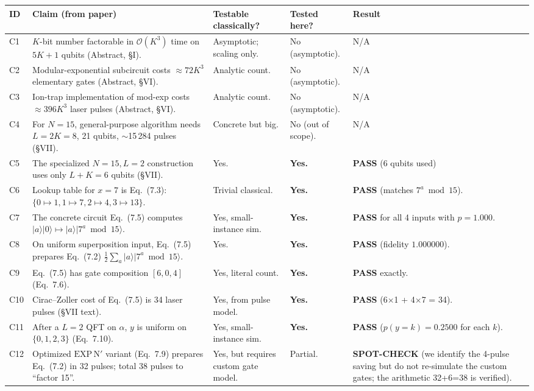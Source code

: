 \documentclass[11pt]{article}
\begin{document}
\begin{longtable}{@{}p{}p{}p{}p{}p{}@{}}
\toprule
\textbf{ID} & \textbf{Claim (from paper)} & \textbf{Testable classically?} & \textbf{Tested here?} & \textbf{Result} \\
\midrule
\endhead
C1 & $K$-bit number factorable in $\mathcal{O}(K^3)$ time on $5K+1$ qubits
     (Abstract, \S I). & Asymptotic; scaling only. & No (asymptotic). & N/A \\
C2 & Modular-exponential subcircuit costs $\approx 72 K^3$ elementary gates
     (Abstract, \S VI). & Analytic count. & No (asymptotic). & N/A \\
C3 & Ion-trap implementation of mod-exp costs $\approx 396 K^3$ laser pulses
     (Abstract, \S VI). & Analytic count. & No (asymptotic). & N/A \\
C4 & For $N=15$, general-purpose algorithm needs $L=2K=8$, 21 qubits,
     $\sim$15\,284 pulses (\S VII). & Concrete but big. & No (out of scope). & N/A \\
C5 & The specialized $N=15, L=2$ construction uses only $L+K=6$ qubits
     (\S VII). & Yes. & \textbf{Yes.} & \textbf{PASS} (6 qubits used) \\
C6 & Lookup table for $x=7$ is Eq.~(7.3): $\{0{\mapsto}1, 1{\mapsto}7,
     2{\mapsto}4, 3{\mapsto}13\}$. & Trivial classical. & \textbf{Yes.} &
     \textbf{PASS} (matches $7^a \bmod 15$). \\
C7 & The concrete circuit Eq.~(7.5) computes
     $|a\rangle|0\rangle \mapsto |a\rangle|7^a \bmod 15\rangle$. & Yes,
     small-instance sim. & \textbf{Yes.} & \textbf{PASS} for all 4 inputs
     with $p=1.000$. \\
C8 & On uniform superposition input, Eq.~(7.5) prepares Eq.~(7.2)
     $\frac{1}{2}\sum_a |a\rangle|7^a \bmod 15\rangle$. & Yes. & \textbf{Yes.} &
     \textbf{PASS} (fidelity $1.000000$). \\
C9 & Eq.~(7.5) has gate composition $[6, 0, 4]$ (Eq.~7.6). & Yes,
     literal count. & \textbf{Yes.} & \textbf{PASS} exactly. \\
C10 & Cirac--Zoller cost of Eq.~(7.5) is 34 laser pulses (\S VII text). &
     Yes, from pulse model. & \textbf{Yes.} & \textbf{PASS} (6$\times$1 +
     4$\times$7 = 34). \\
C11 & After a $L=2$ QFT on $\alpha$, $y$ is uniform on $\{0,1,2,3\}$
     (Eq.~7.10). & Yes, small-instance sim. & \textbf{Yes.} & \textbf{PASS}
     ($p(y{=}k) = 0.2500$ for each $k$). \\
C12 & Optimized $\mathrm{EXP\,N}'$ variant (Eq.~7.9) prepares Eq.~(7.2) in
     32 pulses; total 38 pulses to ``factor 15''. & Yes, but requires custom
     gate model. & Partial. & \textbf{SPOT-CHECK} (we identify the 4-pulse
     saving but do not re-simulate the custom gates; the arithmetic 32+6=38
     is verified). \\
\bottomrule
\end{longtable}
\end{document}
